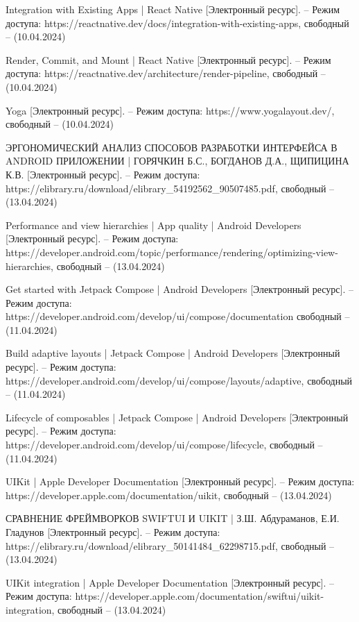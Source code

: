 \begin{thebibliography}{}
	Integration with Existing Apps | React Native [Электронный ресурс]. – Режим доступа: https://reactnative.dev/docs/integration-with-existing-apps,
	свободный – (10.04.2024)
	
	Render, Commit, and Mount | React Native [Электронный ресурс]. – Режим доступа: https://reactnative.dev/architecture/render-pipeline,
	свободный – (10.04.2024)
	
	Yoga [Электронный ресурс]. – Режим доступа: https://www.yogalayout.dev/,
	свободный – (10.04.2024)
	
	ЭРГОНОМИЧЕСКИЙ АНАЛИЗ СПОСОБОВ РАЗРАБОТКИ ИНТЕРФЕЙСА В ANDROID ПРИЛОЖЕНИИ | ГОРЯЧКИН Б.С., БОГДАНОВ Д.А., ЩИПИЦИНА К.В. [Электронный ресурс]. – Режим доступа: https://elibrary.ru/download/elibrary\_54192562\_90507485.pdf,
	свободный – (13.04.2024)
	
	Performance and view hierarchies  | App quality | Android Developers [Электронный ресурс]. – Режим доступа: https://developer.android.com/topic/performance/rendering/optimizing-view-hierarchies,
	свободный – (13.04.2024)
	
	Get started with Jetpack Compose | Android Developers [Электронный ресурс]. – Режим доступа: https://developer.android.com/develop/ui/compose/documentation
	свободный – (11.04.2024)
	
	Build adaptive layouts | Jetpack Compose | Android Developers [Электронный ресурс]. – Режим доступа: https://developer.android.com/develop/ui/compose/layouts/adaptive,
	свободный – (11.04.2024)

	Lifecycle of composables  | Jetpack Compose | Android Developers [Электронный ресурс]. – Режим доступа: https://developer.android.com/develop/ui/compose/lifecycle,
	свободный – (11.04.2024)
	
	UIKit | Apple Developer Documentation [Электронный ресурс]. – Режим доступа: https://developer.apple.com/documentation/uikit, 
	свободный – (13.04.2024)	
	
	СРАВНЕНИЕ ФРЕЙМВОРКОВ SWIFTUI И UIKIT | З.Ш. Абдураманов, Е.И. Гладунов [Электронный ресурс]. – Режим доступа: https://elibrary.ru/download/elibrary\_50141484\_62298715.pdf, 
	свободный – (13.04.2024)
	
	UIKit integration | Apple Developer Documentation [Электронный ресурс]. – Режим доступа: https://developer.apple.com/documentation/swiftui/uikit-integration,
	свободный – (13.04.2024)
	

\end{thebibliography}
